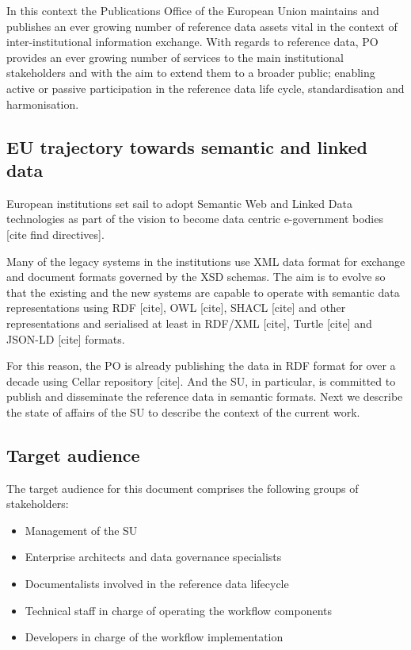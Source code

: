 	In this context the Publications Office of the European Union maintains and publishes an ever growing number of reference data assets vital in the context of inter-institutional information exchange. With regards to reference data, PO provides an ever growing number of services to the main institutional stakeholders and with the aim to extend them to a broader public; enabling active or passive participation in the reference data life cycle, standardisation and harmonisation.

	\subsection{EU trajectory towards semantic and linked data}
	
	European institutions set sail to adopt Semantic Web and Linked Data technologies as part of the vision to become data centric e-government bodies [cite find directives]. 
	
	Many of the legacy systems in the institutions use XML data format for exchange and document formats governed by the XSD schemas. The aim is to evolve so that the existing and the new systems are capable to operate with semantic data representations using RDF [cite], OWL [cite], SHACL [cite] and other representations and serialised at least in RDF/XML [cite], Turtle [cite] and JSON-LD [cite] formats.
	
	For this reason, the PO is already publishing the data in RDF format for over a decade using Cellar repository [cite]. And the SU, in particular, is committed to publish and disseminate the reference data in semantic formats. Next we describe the state of affairs of the SU to describe the context of the current work. 
	
	\subsection{Target audience}
	\label{sec:audience}
	The target audience for this document comprises the following groups of stakeholders:	

	\begin{itemize}
		\item Management of the SU
		\item Enterprise architects and data governance specialists
		\item Documentalists involved in the reference data lifecycle
		\item Technical staff in charge of operating the workflow components
		\item Developers in charge of the workflow implementation		
	\end{itemize}	
	
